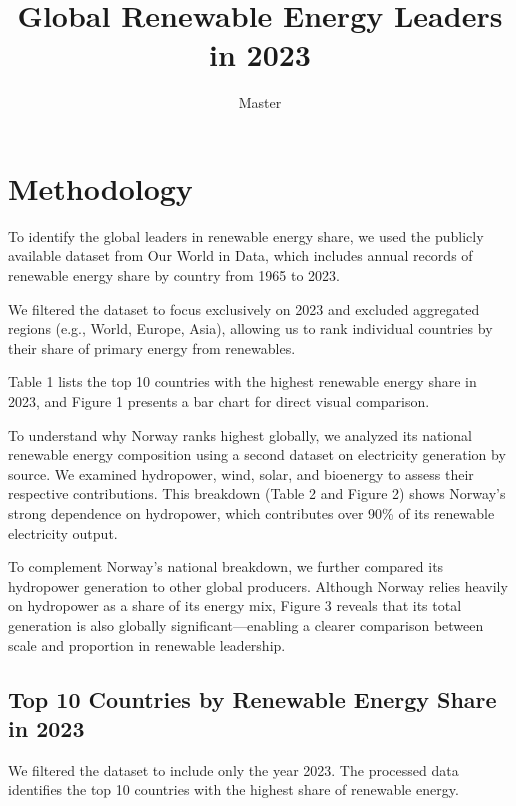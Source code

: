 \documentclass[
  letterpaper,
  DIV=11,
  numbers=noendperiod]{scrartcl}
\title{Global Renewable Energy Leaders in 2023}
\author{Master}
\date{}
\renewcommand*\contentsname{Table of contents}
\newcommand\contentsname{Table of contents}
\begin{document}
\maketitle

\renewcommand*\contentsname{Table of contents}
{
\hypersetup{linkcolor=}
\setcounter{tocdepth}{2}
\tableofcontents
}

\section{Methodology}\label{methodology}

To identify the global leaders in renewable energy share, we used the
publicly available dataset from Our World in Data, which includes annual
records of renewable energy share by country from 1965 to 2023.

We filtered the dataset to focus exclusively on 2023 and excluded
aggregated regions (e.g., World, Europe, Asia), allowing us to rank
individual countries by their share of primary energy from renewables.

Table 1 lists the top 10 countries with the highest renewable energy
share in 2023, and Figure 1 presents a bar chart for direct visual
comparison.

To understand why Norway ranks highest globally, we analyzed its
national renewable energy composition using a second dataset on
electricity generation by source. We examined hydropower, wind, solar,
and bioenergy to assess their respective contributions. This breakdown
(Table 2 and Figure 2) shows Norway's strong dependence on hydropower,
which contributes over 90\% of its renewable electricity output.

To complement Norway's national breakdown, we further compared its
hydropower generation to other global producers. Although Norway relies
heavily on hydropower as a share of its energy mix, Figure 3 reveals
that its total generation is also globally significant---enabling a
clearer comparison between scale and proportion in renewable leadership.

\subsection{Top 10 Countries by Renewable Energy Share in
2023}\label{top-10-countries-by-renewable-energy-share-in-2023}

We filtered the dataset to include only the year 2023. The processed
data identifies the top 10 countries with the highest share of renewable
energy.
\end{document}
